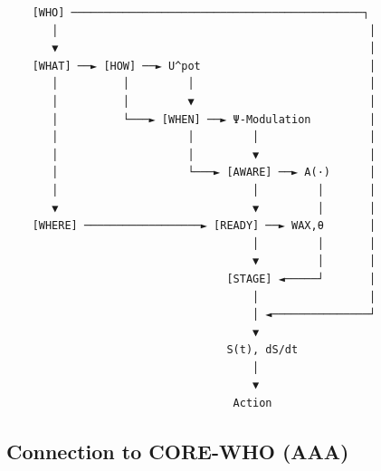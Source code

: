 \begin{tcolorbox}[colback=gray!5!white, colframe=gray!75!black,
    title=10C Causal Flow]
\begin{verbatim}
    [WHO] ─────────────────────────────────────────────┐
       │                                                │
       ▼                                                │
    [WHAT] ──► [HOW] ──► U^pot                          │
       │          │         │                           │
       │          │         ▼                           │
       │          └───► [WHEN] ──► Ψ-Modulation         │
       │                    │         │                 │
       │                    │         ▼                 │
       │                    └───► [AWARE] ──► A(·)      │
       │                              │         │       │
       ▼                              ▼         │       │
    [WHERE] ──────────────────► [READY] ──► WAX,θ       │
                                      │         │       │
                                      ▼         │       │
                                  [STAGE] ◄─────┘       │
                                      │                 │
                                      │ ◄───────────────┘
                                      ▼
                                  S(t), dS/dt
                                      │
                                      ▼
                                   Action
\end{verbatim}
\end{tcolorbox}

\subsection{Connection to CORE-WHO (AAA)}

